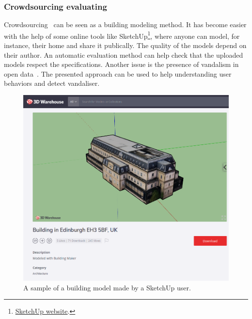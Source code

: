             \subsubsection{Crowdsourcing evaluating}
            Crowdsourcing~\parencite{kovashka2016crowdsourcing} can be seen as a building modeling method.
            It has become easier with the help of some online tools like SketchUp\footnote{
                \href{https://www.sketchup.com}{SketchUp website}.
            }, where anyone can model, for instance, their home and share it publically.
            The quality of the models depend on their author.
            An automatic evaluation method can help check that the uploaded models respect the specifications.
            Another issue is the presence of vandalism in open data~\parencite{neis2012towards}.
            The presented approach can be used to help understanding user behaviors and detect vandaliser.
            \begin{figure}[htpb]
                \centering
                \includegraphics[width=.7\textwidth]{images/introduction/use/crowdsourcing}
                \caption{
                    \label{fig::crowdsourcing}
                    A sample of a building model made by a SketchUp user.
                }
            \end{figure}

